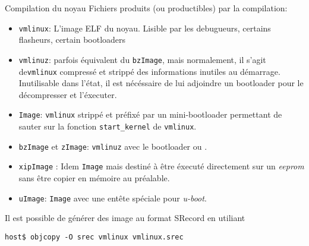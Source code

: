 \begin{frame}[fragile=singleslide]{Compilation du noyau}
  Fichiers produits (ou productibles) par la compilation:
  \begin{itemize}
  \item  \verb+vmlinux+:  L'image  ELF  du  noyau.   Lisible  par  les
    debugueurs, certains flasheurs, certain bootloaders
  \item  \verb+vmlinuz+: parfois  équivalent  du \verb+bzImage+,  mais
    normalement, il  s'agit de\verb+vmlinux+ compressé  et strippé des
    informations inutiles  au démarrage. Inutilisable  dans l'état, il
    est nécéssaire de lui adjoindre un bootloader pour le décompresser
    et l'éxecuter.
  \item  \verb+Image+:  \verb+vmlinux+   strippé  et  préfixé  par  un
    mini-bootloader   permettant    de   sauter   sur    la   fonction
    \verb+start_kernel+ de \verb+vmlinux+.
  \item  \verb+bzImage+  et   \verb+zImage+:  \verb+vmlinuz+  avec  le
    bootloader  ou .
  \item  \verb+xipImage+  :  Idem  \verb+Image+ mais  destiné  à  être
    éxecuté  directement  sur un  \emph{eeprom}  sans  être copier  en
    mémoire au préalable.
  \item  \verb+uImage+:  \verb+Image+ avec  une  entête spéciale  pour
    \emph{u-boot}.
  \end{itemize}
  Il est possible  de générer des image au  format SRecord en utiliant
  \begin{lstlisting}
host$ objcopy -O srec vmlinux vmlinux.srec
  \end{lstlisting}
\end{frame}


